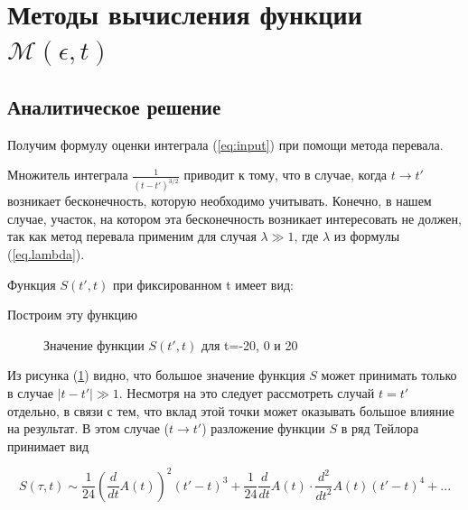 \documentclass[%
bachelor,    %
natbib,      %
subf,        %
href,        %
colorlinks,  %
]{disser}
\newcommand{\sectionbreak}{\clearpage}
\newcommand{\cM}{\mathcal{M}}
\begin{document}
\sectionbreak
\section{Методы вычисления функции $\cM(\epsilon,t)$}
\subsection{Аналитическое решение}
Получим формулу оценки интеграла (\ref{eq:input}) при помощи метода перевала.

Множитель интеграла $\frac{1}{(t-t')^{3/2}}$ приводит к тому, что в случае, когда $t \rightarrow t'$ возникает бесконечность, которую  необходимо учитывать. Конечно, в нашем случае, участок, на котором эта бесконечность возникает интересовать не должен, так как метод перевала применим для случая $\lambda \gg 1$, где $\lambda$ из формулы (\ref{eq.lambda}).  

Функция $S(t', t)$ при фиксированном t имеет вид:

Построим эту функцию 

\begin{figure}[h]
	\caption{Значение функции $S(t', t)$ для t=-20, 0 и 20}
	\label{ris:S}
\end{figure}

Из рисунка (\ref{ris:S}) видно, что большое значение функция $S$ может принимать только в случае $|t - t'|\gg 1 $. Несмотря на это следует рассмотреть случай $t = t'$ отдельно, в связи с тем, что вклад этой точки может оказывать большое влияние на результат. В этом случае ($t \rightarrow t'$) разложение функции $S$ в ряд Тейлора принимает вид

$$ 
S(\tau, t) \sim \frac{1}{24} \left( \frac{d}{dt}A(t)\right)^{2}(t' - t)^3 + \frac{1}{24} \frac{d}{dt}A(t) \cdot \frac{d^2}{dt^2}A(t) (t' - t)^4 + ...
$$
\end{document}
